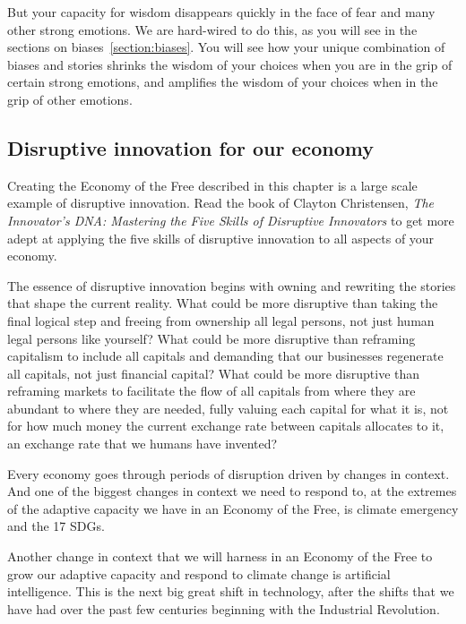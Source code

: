 But your capacity for wisdom disappears quickly in the face of fear and many other strong emotions. We are hard-wired to do this, as you will see in the sections on biases~\ref{section:biases}. You will see how your unique combination of biases and stories shrinks the wisdom of your choices when you are in the grip of certain strong emotions, and amplifies the wisdom of your choices when in the grip of other emotions.


\subsection{Disruptive innovation for our economy}
Creating the Economy of the Free  described in this chapter is a large scale example of disruptive innovation. Read the book of Clayton Christensen, \emph{The Innovator's DNA: Mastering the Five Skills of Disruptive Innovators}\cite{christensen-dna} to get more adept at applying the five skills of disruptive innovation to all aspects of your economy. 


The essence of disruptive innovation  begins with owning and rewriting the stories that shape the current reality. What could be more disruptive than taking the final logical step and freeing from ownership all legal persons, not just human legal persons like yourself? What could be more disruptive than reframing capitalism to include all capitals and demanding that our businesses regenerate all capitals, not just financial capital? What could be more disruptive than reframing markets to facilitate the flow of all capitals from where they are abundant to where they are needed, fully valuing each capital for what it is, not for how much money the current exchange rate between capitals allocates to it, an exchange rate that we humans have invented? 


Every economy  goes through periods of disruption driven by changes in context. And one of the biggest changes in context we need to respond to, at the extremes of the adaptive capacity we have in an Economy of the Free, is climate emergency  and the 17 SDGs. 


Another change in context that we will harness in an Economy of the Free to grow our adaptive capacity and respond to climate change is artificial intelligence. This is the next big great shift in technology, after the shifts that we have had over the past few centuries beginning with the Industrial Revolution.


